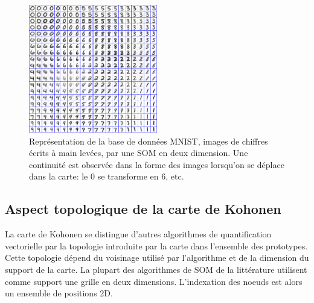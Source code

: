 \documentclass[../main]{subfiles}
\begin{document}



\begin{figure}
\centering
\includegraphics[width=0.5\textwidth]{digits.jpg}
\caption{Représentation de la base de données MNIST, images de chiffres écrits à main levées, par une SOM en deux dimension. Une continuité est observée dans la forme des images lorsqu'on se déplace dans la carte: le $0$ se transforme en $6$, etc.}
\label{fig:SOM}
\end{figure}

\subsection{Aspect topologique de la carte de Kohonen}

La carte de Kohonen se distingue d'autres algorithmes de quantification vectorielle par la topologie introduite par la carte dans l'ensemble des prototypes. Cette topologie dépend du voisinage utilisé par l'algorithme et de la dimension du support de la carte.
La plupart des algorithmes de SOM de la littérature utilisent comme support une grille en deux dimensions. L'indexation des noeuds est alors un ensemble de positions 2D.
\end{document}
